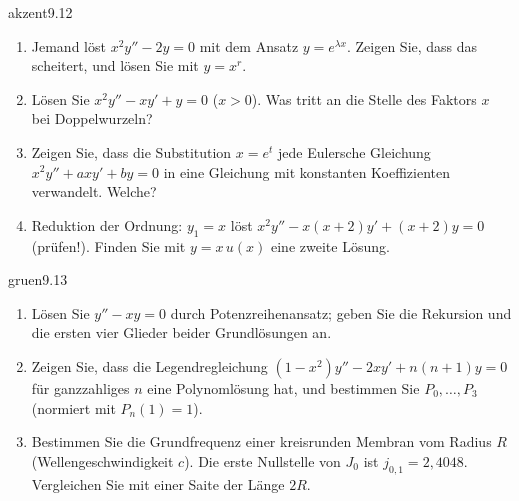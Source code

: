\begin{karte}{akzent}{9.12}{\typstolper}{}
\begin{enumerate}[label=(\alph*),leftmargin=1.6em,itemsep=2pt]
\item Jemand löst $x^{2}y'' - 2y = 0$ mit dem Ansatz $y = e^{\lambda x}$. Zeigen Sie, dass das scheitert, und lösen Sie mit $y = x^{r}$.
\item Lösen Sie $x^{2}y'' - xy' + y = 0$ ($x > 0$). Was tritt an die Stelle des Faktors $x$ bei Doppelwurzeln?
\item Zeigen Sie, dass die Substitution $x = e^{t}$ jede Eulersche Gleichung $x^{2}y'' + axy' + by = 0$ in eine Gleichung mit konstanten Koeffizienten verwandelt. Welche?
\item Reduktion der Ordnung: $y_1 = x$ löst $x^{2}y'' - x(x + 2)y' + (x + 2)y = 0$ (prüfen!). Finden Sie mit $y = x\,u(x)$ eine zweite Lösung.
\end{enumerate}
\end{karte}

\begin{karte}{gruen}{9.13}{\typwerk}{}
\begin{enumerate}[label=(\alph*),leftmargin=1.6em,itemsep=2pt]
\item Lösen Sie $y'' - xy = 0$ durch Potenzreihenansatz; geben Sie die Rekursion und die ersten vier Glieder beider Grundlösungen an.
\item Zeigen Sie, dass die Legendregleichung $(1 - x^{2})y'' - 2xy' + n(n + 1)y = 0$ für ganzzahliges $n$ eine Polynomlösung hat, und bestimmen Sie $P_0, \dots, P_3$ (normiert mit $P_n(1) = 1$).
\item Bestimmen Sie die Grundfrequenz einer kreisrunden Membran vom Radius $R$ (Wellengeschwindigkeit $c$). Die erste Nullstelle von $J_0$ ist $j_{0,1} = 2{,}4048$. Vergleichen Sie mit einer Saite der Länge $2R$.
\end{enumerate}
\end{karte}

